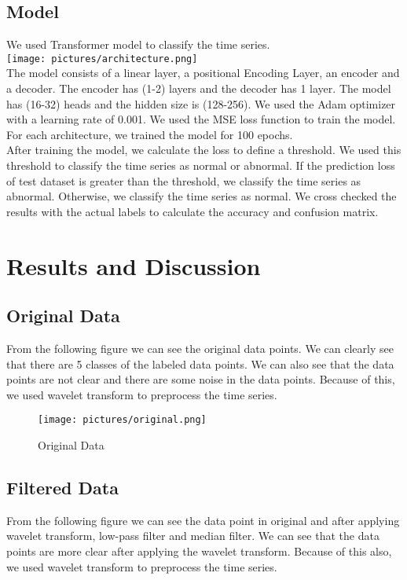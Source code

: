 \subsection{Model}
We used Transformer model to classify the time series. \\
\texttt{[image: pictures/architecture.png]}
\\
The model consists of a linear layer, a positional Encoding Layer, an encoder and a decoder. The encoder has (1-2) layers and the decoder has 1 layer. The model has (16-32) heads and the hidden size is (128-256). We used the Adam optimizer with a learning rate of 0.001. We used the MSE loss function to train the model.
\\
For each architecture, we trained the model for 100 epochs. 
\\
After training the model, we calculate the loss to define a threshold. We used this threshold to classify the time series as normal or abnormal. 
If the prediction loss of test dataset is greater than the threshold, we classify the time series as abnormal. Otherwise, we classify the time series as normal.
We cross checked the results with the actual labels to calculate the accuracy and confusion matrix.

\section{Results and Discussion}
\subsection{Original Data}

From the following figure we can see the original data points. We can clearly see that there are 5 classes of the labeled data points. We can also see that the data points are not clear and there are some noise in the data points. Because of this, we used wavelet transform to preprocess the time series.

\begin{figure}[htbp]
    \centering
    \texttt{[image: pictures/original.png]}
    \caption{Original Data}
\end{figure}

\subsection{Filtered Data}

From the following figure we can see the data point in original and after applying wavelet transform, low-pass filter and median filter. We can see that the data points are more clear after applying the wavelet transform. Because of this also, we used wavelet transform to preprocess the time series.

